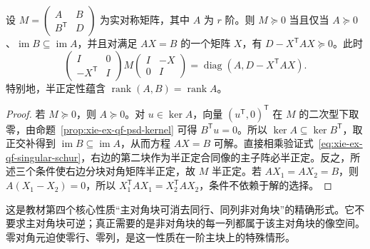 \begin{theorem}
\label{thm:xie-ex-qf-singular-schur}
设 $M=\begin{pmatrix}A&B\\B^{\mathsf T}&D\end{pmatrix}$ 为实对称矩阵，其中 $A$ 为 $r$ 阶。则 $M\succeq0$ 当且仅当 $A\succeq0$、$\operatorname{im}B\subseteq\operatorname{im}A$，并且对满足 $AX=B$ 的一个矩阵 $X$，有 $D-X^{\mathsf T}AX\succeq0$。此时
\begin{equation}
 \begin{pmatrix}I&0\\-X^{\mathsf T}&I\end{pmatrix}
 M\begin{pmatrix}I&-X\\0&I\end{pmatrix}
 =\operatorname{diag}(A,D-X^{\mathsf T}AX).
 \label{eq:xie-ex-qf-singular-schur}
\end{equation}
特别地，半正定性蕴含 $\operatorname{rank}(A,B)=\operatorname{rank}A$。
\end{theorem}
\begin{proof}
若 $M\succeq0$，则 $A\succeq0$。对 $u\in\ker A$，向量 $(u^{\mathsf T},0)^{\mathsf T}$ 在 $M$ 的二次型下取零，由命题~\ref{prop:xie-ex-qf-psd-kernel} 可得 $B^{\mathsf T}u=0$。所以 $\ker A\subseteq\ker B^{\mathsf T}$，取正交补得到 $\operatorname{im}B\subseteq\operatorname{im}A$，从而方程 $AX=B$ 可解。直接相乘验证式~\eqref{eq:xie-ex-qf-singular-schur}，右边的第二块作为半正定合同像的主子阵必半正定。反之，所述三个条件使右边分块对角矩阵半正定，故 $M$ 半正定。若 $AX_1=AX_2=B$，则 $A(X_1-X_2)=0$，所以 $X_1^{\mathsf T}AX_1=X_2^{\mathsf T}AX_2$，条件不依赖于解的选择。
\end{proof}

这是教材第四个核心性质“主对角块可消去同行、同列非对角块”的精确形式。它不要求主对角块可逆；真正需要的是非对角块的每一列都属于该主对角块的像空间。零对角元迫使零行、零列，是这一性质在一阶主块上的特殊情形。

